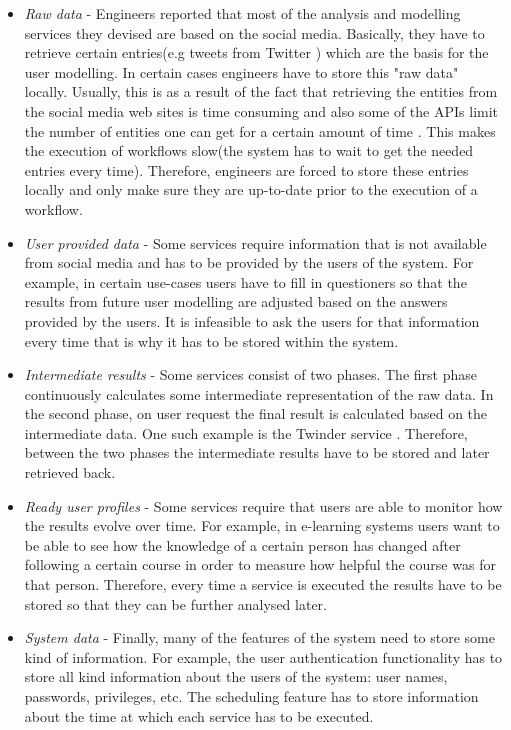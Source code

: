 \begin{itemize}

	\item \textit{Raw data} - Engineers reported that most of the analysis and modelling services they devised are based on the social media. Basically, they have to retrieve certain entries(e.g tweets from Twitter ) which are the basis for the user modelling. In certain cases engineers have to store this "raw data" locally. Usually, this is as a result of the fact that retrieving the entities from the social media web sites is time consuming and also some of the APIs limit the number of entities one can get for a certain amount of time \cite{cheong2009integrating}. This makes the execution of workflows slow(the system has to wait to get the needed entries every time). Therefore, engineers are forced to store these entries locally and only make sure they are up-to-date prior to the execution of a workflow.
	
	\item \textit{User provided data} - Some services require information that is not available from social media and has to be provided by the users of the system. For example, in certain use-cases users have to fill in questioners so that the results from future user modelling are adjusted based on the answers provided by the users. It is infeasible to ask the users for that information every time that is why it has to be stored within the system.
	
	\item \textit{Intermediate results} - Some services consist of two phases. The first phase continuously calculates some intermediate representation of the raw data. In the second phase, on user request the final result is calculated based on the intermediate data. One such example is the Twinder service \cite{tao2012twinder}. Therefore, between the two phases the intermediate results have to be stored and later retrieved back.
	
	\item \textit{Ready user profiles} - Some services require that users are able to monitor how the results evolve over time. For example, in e-learning systems users want to be able to see how the knowledge of a certain person has changed after following a certain course in order to measure how helpful the course was for that person. Therefore, every time a service is executed the results have to be stored so that they can be further analysed later.
	
	\item \textit{System data} - Finally, many of the features of the system need to store some kind of information. For example, the user authentication functionality has to store all kind information about the users of the system: user names, passwords, privileges, etc. The scheduling feature has to store information about the time at which each service has to be executed. 
	
\end{itemize}

